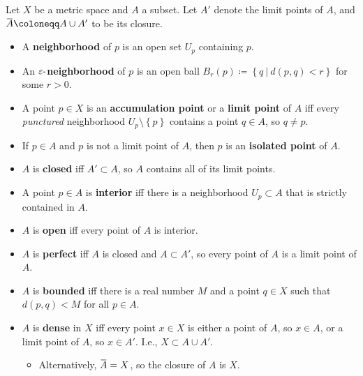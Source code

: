 \begin{definition}

Let \(X\) be a metric space and \(A\) a subset. Let \(A'\) denote the
limit points of \(A\), and
\(\mkern 1.5mu\overline{\mkern-1.5muA\mkern-1.5mu}\mkern 1.5mu \coloneqq A\cup A'\)
to be its closure.

\begin{itemize}
\item
  A \textbf{neighborhood} of \(p\) is an open set \(U_p\) containing
  \(p\).
\item
  An \({\varepsilon}{\hbox{-}}\)\textbf{neighborhood} of \(p\) is an
  open ball
  \(B_r(p) \coloneqq\left\{{q {~\mathrel{\Big|}~}d(p, q) < r}\right\}\)
  for some \(r>0\).
\item
  A point \(p\in X\) is an \textbf{accumulation point} or a
  \textbf{limit point} of \(A\) iff every \emph{punctured} neighborhood
  \(U_p\setminus\left\{{p}\right\}\) contains a point \(q\in A\), so
  \(q\neq p\).
\item
  If \(p\in A\) and \(p\) is not a limit point of \(A\), then \(p\) is
  an \textbf{isolated point} of \(A\).
\item
  \(A\) is \textbf{closed} iff \(A' \subset A\), so \(A\) contains all
  of its limit points.
\item
  A point \(p\in A\) is \textbf{interior} iff there is a neighborhood
  \(U_p \subset A\) that is strictly contained in \(A\).
\item
  \(A\) is \textbf{open} iff every point of \(A\) is interior.
\item
  \(A\) is \textbf{perfect} iff \(A\) is closed and \(A\subset A'\), so
  every point of \(A\) is a limit point of \(A\).
\item
  \(A\) is \textbf{bounded} iff there is a real number \(M\) and a point
  \(q\in X\) such that \(d(p, q) < M\) for all \(p\in A\).
\item
  \(A\) is \textbf{dense} in \(X\) iff every point \(x\in X\) is either
  a point of \(A\), so \(x\in A\), or a limit point of \(A\), so
  \(x\in A'\). I.e., \(X\subset A\cup A'\).

  \begin{itemize}
  \tightlist
  \item
    Alternatively,
    \(\mkern 1.5mu\overline{\mkern-1.5muA\mkern-1.5mu}\mkern 1.5mu = X\),
    so the closure of \(A\) is \(X\).
  \end{itemize}
\end{itemize}

\end{definition}

